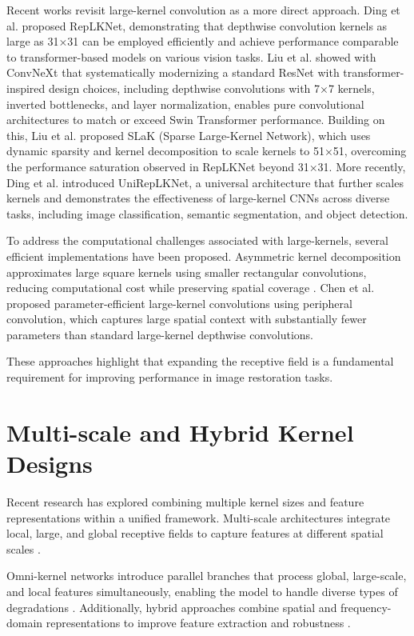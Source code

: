 Recent works revisit large-kernel convolution as a more direct approach. Ding et al. \cite{replknet2022} proposed RepLKNet, demonstrating that depthwise convolution kernels as large as 31×31 can be employed efficiently and achieve performance comparable to transformer-based models on various vision tasks. Liu et al. \cite{Liu2022} showed with ConvNeXt that systematically modernizing a standard ResNet with transformer-inspired design choices, including depthwise convolutions with 7×7 kernels, inverted bottlenecks, and layer normalization, enables pure convolutional architectures to match or exceed Swin Transformer performance. Building on this, Liu et al. \cite{Liu2023} proposed SLaK (Sparse Large-Kernel Network), which uses dynamic sparsity and kernel decomposition to scale kernels to 51×51, overcoming the performance saturation observed in RepLKNet beyond 31×31. More recently, Ding et al.  \cite{Din+24} introduced UniRepLKNet, a universal architecture that further scales kernels and demonstrates the effectiveness of large-kernel CNNs across diverse tasks, including image classification, semantic segmentation, and object detection. 

To address the computational challenges associated with large-kernels, several efficient implementations have been proposed. Asymmetric kernel decomposition approximates large square kernels using smaller rectangular convolutions, reducing computational cost while preserving spatial coverage \cite{qu2024alkdnet}. Chen et al. \cite{PeLK2024} proposed parameter-efficient large-kernel convolutions using peripheral convolution, which captures large spatial context with substantially fewer parameters than standard large-kernel depthwise convolutions.


These approaches highlight that expanding the receptive field is a fundamental requirement for improving performance in image restoration tasks.

\section{Multi-scale and Hybrid Kernel Designs}
Recent research has explored combining multiple kernel sizes and feature representations within a unified framework. Multi-scale architectures integrate local, large, and global receptive fields to capture features at different spatial scales \cite{ronneberger2015unet}.

Omni-kernel networks introduce parallel branches that process global, large-scale, and local features simultaneously, enabling the model to handle diverse types of degradations \cite{cui2024oknet}. Additionally, hybrid approaches combine spatial and frequency-domain representations to improve feature extraction and robustness \cite{LKFN2024}.


